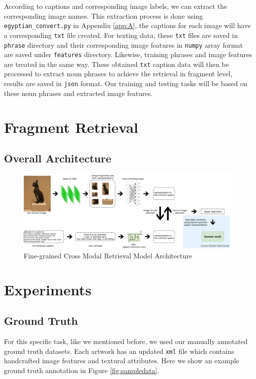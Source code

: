 According to captions and corresponding image labels, we can extract the corresponding image names. This extraction process is done using \verb|egyptian_convert.py| in Appendix \ref{app:A}, the captions for each image will have a corresponding \verb|txt| file created. For texting data, these \verb|txt| files are saved in \verb|phrase| directory and their corresponding image features in \verb|numpy| array format are saved under \verb|features| directory. Likewise, training phrases and image features are treated in the same way. These obtained \verb|txt| caption data will then be processed to extract noun phrases to achieve the retrieval in fragment level, results are saved in \verb|json| format. Our training and testing tasks will be based on these noun phrases and extracted image features.

\section{Fragment Retrieval}

\subsection{Overall Architecture}

\begin{figure}[h!]
\centering
\includegraphics[width=1.1\textwidth]{archi.pdf}
\caption{Fine-grained Cross Modal Retrieval Model Architecture}
\label{fig:mainarch}
\end{figure}


\section{Experiments}

\subsection{Ground Truth}

For this specific task, like we mentioned before, we used our manually annotated ground truth datasets. Each artwork has an updated \verb|xml| file which contains handcrafted image features and textural attributes. Here we show an example ground truth annotation in Figure \ref{fig:sampledata}.

